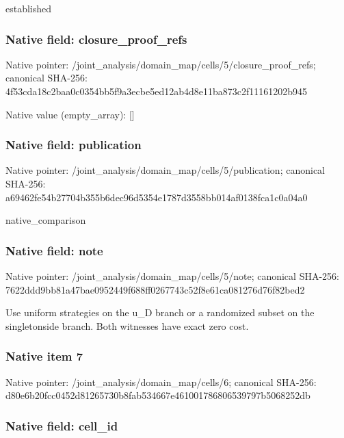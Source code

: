 \documentclass[10pt,a4paper]{article}
\begin{document}
established


\subsubsection{Native field: closure\_proof\_refs}


Native pointer: /joint\_analysis/domain\_m\allowbreak{}ap/cells/5/closure\_proof\allowbreak{}\_refs; canonical SHA-256: 4f53cda18c2baa0c0354bb5f\allowbreak{}9a3ecbe5ed12ab4d8e11ba87\allowbreak{}3c2f11161202b945



Native value (empty\_array): []



\subsubsection{Native field: publication}


Native pointer: /joint\_analysis/domain\_m\allowbreak{}ap/cells/5/publication; canonical SHA-256: a69462fe54b27704b355b6de\allowbreak{}c96d5354e1787d3558bb014a\allowbreak{}f0138fca1c0a04a0


native\_comparison


\subsubsection{Native field: note}


Native pointer: /joint\_analysis/domain\_map/cells/5/note; canonical SHA-256: 7622ddd9bb81a47bae095244\allowbreak{}9f688ff0267743c52f8e61ca\allowbreak{}081276d76f82bed2


Use uniform strategies on the u\_D branch or a randomized subset on the singletonside branch. Both witnesses have exact zero cost.


\subsubsection{Native item 7}


Native pointer: /joint\_analysis/domain\_map/cells/6; canonical SHA-256: d80e6b20fcc0452d81265730\allowbreak{}b8fab534667e461001786806\allowbreak{}539797b5068252db



\subsubsection{Native field: cell\_id}
\end{document}
